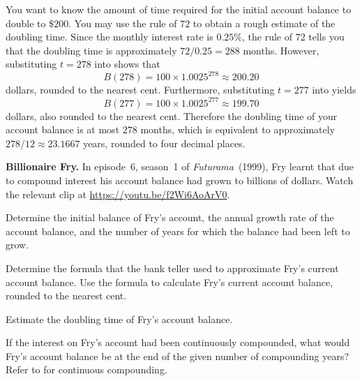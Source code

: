 \documentclass[a4paper,oneside,12pt]{article}
\begin{document}
{\begin{solution}
You want to know the amount of time required for the initial account
balance to double to $\$200$.  You may use the rule of $72$ to obtain
a rough estimate of the doubling time.  Since the monthly interest
rate is $0.25\%$, the rule of $72$ tells you that the doubling time is
approximately $72 / 0.25 = 288$ months.  However, substituting
$t = 278$ into 
shows that
\[
B(278)
=
100 \times 1.0025^{278}
\approx
200.20
\]
dollars, rounded to the nearest cent.  Furthermore, substituting
$t = 277$ into  yields
\[
B(277)
=
100 \times 1.0025^{277}
\approx
199.70
\]
dollars, also rounded to the nearest cent.  Therefore the doubling
time of your account balance is at most $278$ months, which is
equivalent to approximately $278 / 12 \approx 23.1667$ years, rounded
to four decimal places.
\end{solution}
}{}

\begin{exercise}
\textbf{Billionaire Fry.}
In episode~6, season~1 of \emph{Futurama}~(1999), Fry learnt that due
to compound interest his account balance had grown to billions of
dollars.  Watch the relevant clip at
\url{https://youtu.be/f2Wi6AoArV0}.
\begin{packedenum}
\item\label{subex:exponential:Fry_initial_balance}
  Determine the initial balance of Fry's account, the annual growth
  rate of the account balance, and the number of years for which the
  balance had been left to grow.

\item\label{subex:exponential:Fry_formula}
  Determine the formula that the bank teller used to approximate Fry's
  current account balance.  Use the formula to calculate Fry's current
  account balance, rounded to the nearest cent.

\item\label{subex:exponential:Fry_doubling_time}
  Estimate the doubling time of Fry's account balance.

\item\label{subex:exponential:Fry_continuous_compounding}
  If the interest on Fry's account had been continuously compounded,
  what would Fry's account balance be at the end of the given number
  of compounding years?  Refer to 
  for continuous compounding.
\end{packedenum}
\end{exercise}
\end{document}
